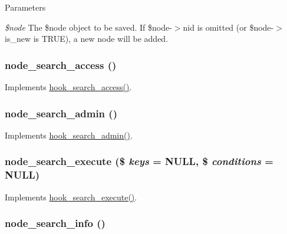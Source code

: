 \begin{DoxyParams}{Parameters}
\item[{\em \$node}]The \$node object to be saved. If \$node-\/$>$nid is omitted (or \$node-\/$>$is\_\-new is TRUE), a new node will be added. \end{DoxyParams}
\hypertarget{node_8module_a2fca75042f74ce9312bf000b0d9dd6ea}{
\subsubsection[{node\_\-search\_\-access}]{\setlength{\rightskip}{0pt plus 5cm}node\_\-search\_\-access ()}}
\label{node_8module_a2fca75042f74ce9312bf000b0d9dd6ea}
Implements \hyperlink{group__search_gac49e6fd7370e65efeaf484ec992de1f0}{hook\_\-search\_\-access()}. \hypertarget{node_8module_a68eda145ae4169ab8ed713b50ff035c8}{
\subsubsection[{node\_\-search\_\-admin}]{\setlength{\rightskip}{0pt plus 5cm}node\_\-search\_\-admin ()}}
\label{node_8module_a68eda145ae4169ab8ed713b50ff035c8}
Implements \hyperlink{group__search_gae7c7a4e3d4ee63b5aab3742b0e12624e}{hook\_\-search\_\-admin()}. \hypertarget{node_8module_ad7047dcdd1c1934351adb73de080c640}{
\subsubsection[{node\_\-search\_\-execute}]{\setlength{\rightskip}{0pt plus 5cm}node\_\-search\_\-execute (\$ {\em keys} = {\ttfamily NULL}, \/  \$ {\em conditions} = {\ttfamily NULL})}}
\label{node_8module_ad7047dcdd1c1934351adb73de080c640}
Implements \hyperlink{group__search_ga00be3e4a3b64ad73f8ad1304a450cee5}{hook\_\-search\_\-execute()}. \hypertarget{node_8module_a37b324db553dbb556ae8932d72bf1fba}{
\subsubsection[{node\_\-search\_\-info}]{\setlength{\rightskip}{0pt plus 5cm}node\_\-search\_\-info ()}}
